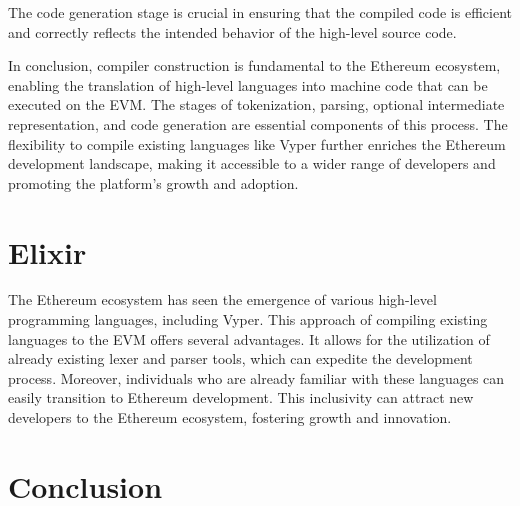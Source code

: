    The code generation stage is crucial in ensuring that the compiled code is efficient and correctly reflects the intended behavior of the high-level source code.

In conclusion, compiler construction is fundamental to the Ethereum ecosystem, enabling the translation of high-level languages into machine code that can be executed on the EVM. The stages of tokenization, parsing, optional intermediate representation, and code generation are essential components of this process. The flexibility to compile existing languages like Vyper further enriches the Ethereum development landscape, making it accessible to a wider range of developers and promoting the platform's growth and adoption.

\section{Elixir}

The Ethereum ecosystem has seen the emergence of various high-level programming languages, including Vyper. This approach of compiling existing languages to the EVM offers several advantages. It allows for the utilization of already existing lexer and parser tools, which can expedite the development process. Moreover, individuals who are already familiar with these languages can easily transition to Ethereum development. This inclusivity can attract new developers to the Ethereum ecosystem, fostering growth and innovation.

\section{Conclusion}



